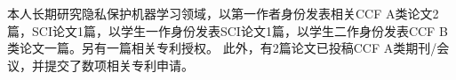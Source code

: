 本人长期研究隐私保护机器学习领域，以第一作者身份发表相关CCF A类论文2篇，SCI论文1篇，以学生一作身份发表SCI论文1篇，以学生二作身份发表CCF B类论文一篇。另有一篇相关专利授权。
此外，有2篇论文已投稿CCF A类期刊/会议，并提交了数项相关专利申请。